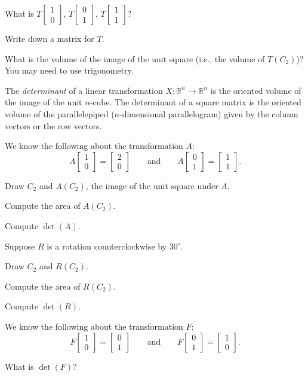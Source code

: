 \documentclass[14pt]{problemset}
\newcommand{\R}{\mathbb{R}}
\newcommand{\mat}[1]{\begin{bmatrix}#1\end{bmatrix}}
\begin{document}
	\vspace{-6em}
	\begin{parts}
		\item What is $T\mat{1\\0}$, $T\mat{0\\1}$, $T\mat{1\\1}$?
		\item Write down a matrix for $T$.
		\item What is the volume of the image of the unit square (i.e., the volume of $T(C_2)$)?  You may need
			to use trigonometry.
	\end{parts}
	
	\begin{definition}[Determinant]
	The \emph{determinant} of a linear transformation $X:\R^n\to \R^n$ is the 
	oriented volume of the image of the unit $n$-cube.  The determinant
	of a square matrix is the oriented volume of the parallelepiped 
	($n$-dimensional parallelogram) given by the column vectors or the row
	vectors.
	\end{definition}

	\question
	We know the following about the transformation $A$:
	\[
		A\mat{1\\0}=\mat{2\\0}\qquad\text{and}\qquad A\mat{0\\1}=\mat{1\\1}.
	\]
	\begin{parts}
	\item Draw $C_2$ and $A(C_2)$, the image of the unit square
			under $A$.
		\item Compute the area of $A (C_2)$.
		\item Compute $\det(A)$.
	\end{parts}

	\question
	Suppose $R$ is a rotation counterclockwise by $30^\circ$.
	\begin{parts}
	\item Draw $C_2$ and $R(C_2)$.
	\item Compute the area of $R(C_2)$.
		\item Compute $\det(R)$.
	\end{parts}
	
	\question
	We know the following about the transformation $F$:
	\[
		F\mat{1\\0}=\mat{0\\1}\qquad\text{and}\qquad F\mat{0\\1}=\mat{1\\0}.
	\]
	\begin{parts}
		\item What is $\det(F)$?
	\end{parts}
\end{document}
